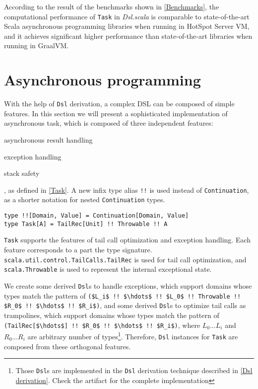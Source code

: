 \begin{description}
  According to the result of the benchmarks shown in \cref{Benchmarks}, the computational performance of \lstinline{Task} in \textit{Dsl.scala} is comparable to state-of-the-art Scala asynchronous programming libraries when running in HotSpot Server VM, and it achieves significant higher performance than state-of-the-art libraries when running in GraalVM.
\end{description}

\section{Asynchronous programming}\label{Asynchronous programming}

With the help of \lstinline{Dsl} derivation, a complex DSL can be composed of simple features. In this section we will present a sophisticated implementation of asynchronous task, which is composed of three independent features:
\begin{enumerate*}
  \item asynchronous result handling
  \item exception handling
  \item stack safety
\end{enumerate*}, as defined in \cref{Task}. A new infix type alias \lstinline{!!} is used instead of \lstinline{Continuation}, as a shorter notation for nested \lstinline{Continuation} types.

\begin{lstlisting}[caption={The definition of asynchronous \lstinline{Task}},label={Task}]
type !![Domain, Value] = Continuation[Domain, Value]
type Task[A] = TailRec[Unit] !! Throwable !! A
\end{lstlisting}

\lstinline{Task} supports the features of tail call optimization and exception handling. Each feature corresponds to a part the type signature. \lstinline{scala.util.control.TailCalls.TailRec} is used for tail call optimization, and \lstinline{scala.Throwable} is used to represent the internal exceptional state.

We create some derived \lstinline{Dsl}s to handle exceptions, which support domains whose types match the pattern of \lstinline[mathescape=true]{($L_i$ !! $\hdots$ !! $L_0$ !! Throwable !! $R_0$ !! $\hdots$ !! $R_i$)}, and some derived \lstinline{Dsl}s to optimize tail calls as trampolines, which support domains whose types match the pattern of \lstinline[mathescape=true]{(TailRec[$\hdots$] !! $R_0$ !! $\hdots$ !! $R_i$)}, where $L_0 \hdots L_i$ and $R_0 \hdots R_i$ are arbitrary number of types\footnote{Those \lstinline{Dsl}s are implemented in the \lstinline{Dsl} derivation technique described in \cref{Dsl derivation}. Check the artifact for the complete implementation}. Therefore, \lstinline{Dsl} instances for \lstinline{Task} are composed from these orthogonal features.


